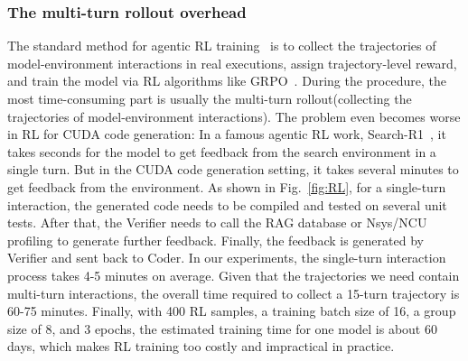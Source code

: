 \subsubsection{The multi-turn rollout overhead}
The standard method for agentic RL training~\cite{jin2025searchr1trainingllmsreason,wang2025ragenunderstandingselfevolutionllm} is to collect the trajectories of model-environment interactions in real executions, assign trajectory-level reward, and train the model via RL algorithms like GRPO~\cite{Guo_2025}.  During the procedure, the most time-consuming part is usually the multi-turn rollout(collecting the trajectories of model-environment interactions). The problem even becomes worse in RL for CUDA code generation: In a famous agentic RL work, Search-R1~\cite{jin2025searchr1trainingllmsreason}, it takes seconds for the model to get feedback from the search environment in a single turn. But in the CUDA code generation setting, it takes several minutes to get feedback from the environment. As shown in Fig.~\ref {fig:RL}, for a single-turn interaction, the generated code needs to be compiled and tested on several unit tests. After that, the Verifier needs to call the RAG database or Nsys/NCU profiling to generate further feedback. Finally, the feedback is generated by Verifier and sent back to Coder. In our experiments, the single-turn interaction process takes 4-5 minutes on average. Given that the trajectories we need contain multi-turn interactions, the overall time required to collect a 15-turn trajectory is 60-75 minutes. Finally, with 400 RL samples, a training batch size of 16, a group size of 8, and 3 epochs, the estimated training time for one model is about 60 days, which makes RL training too costly and impractical in practice. 

